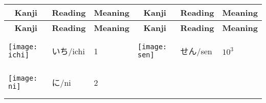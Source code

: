 \documentclass[a4paper,12pt]{extarticle}
\begin{document}
\begin{longtable}{|lll|lll|}
	\multicolumn{1}{c}{\textbf{Kanji}} & \multicolumn{1}{c}{\textbf{Reading}} & \multicolumn{1}{c}{\textbf{Meaning}}
	                                   & \multicolumn{1}{c}{\textbf{Kanji}}   & \multicolumn{1}{c}{\textbf{Reading}} & \multicolumn{1}{c}{\textbf{Meaning}}
	\\ \hline
	\endfirsthead

	\multicolumn{1}{c}{\textbf{Kanji}} & \multicolumn{1}{c}{\textbf{Reading}} & \multicolumn{1}{c}{\textbf{Meaning}}
	                                   & \multicolumn{1}{c}{\textbf{Kanji}}   & \multicolumn{1}{c}{\textbf{Reading}} & \multicolumn{1}{c}{\textbf{Meaning}}
	\\ \hline
	\endhead

	\hline
	\endfoot

	\hline \hline
	\endlastfoot

	\begin{minipage}{0.2\textwidth}
		\centerline{
			\texttt{[image: ichi]}
		}
	\end{minipage}
	                                   &
	\begin{CJK}{UTF8}{min}いち/ichi\end{CJK}
	                                   &
	1

	                                   &
	\begin{minipage}{0.2\textwidth}
		\centerline{
			\texttt{[image: sen]}
		}
	\end{minipage}
	                                   &
	\begin{CJK}{UTF8}{min}せん/sen\end{CJK}
	                                   &
	$10^{3}$
	\\
	\begin{minipage}{0.2\textwidth}
		\centerline{
			\texttt{[image: ni]}
		}
	\end{minipage}
	                                   &
	\begin{CJK}{UTF8}{min}に/ni\end{CJK}
	                                   &
	2


\end{longtable}
\end{document}

